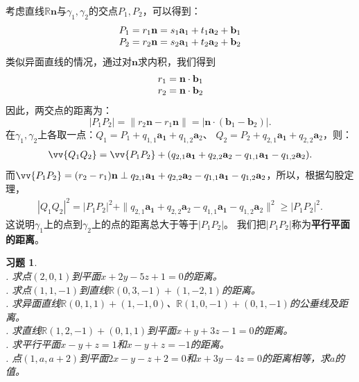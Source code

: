 \documentclass[12pt,UTF8]{ctexbook}
\newtheorem{xt}{习题}[section]
\begin{document}
考虑直线$\mathbb{R}\mathbf{n}$与$\gamma_1,\gamma_2$的交点$P_1,P_2$，可以得到：
$$
\begin{array}[]{c}
    P_1 = r_1\mathbf{n} = s_1\mathbf{a}_1 + t_1\mathbf{a}_2 + \mathbf{b}_1 \\
    P_2 = r_2\mathbf{n} = s_2\mathbf{a}_1 + t_2\mathbf{a}_2 + \mathbf{b}_2 
\end{array} 
$$
类似异面直线的情况，通过对$\mathbf{n}$求内积，我们得到
$$
\begin{array}[]{c}
    r_1 = \mathbf{n}\cdot\mathbf{b}_1 \\
    r_2 = \mathbf{n}\cdot\mathbf{b}_2 
\end{array}
$$
因此，两交点的距离为：
$$ |P_1P_2| = \| r_2\mathbf{n} - r_1\mathbf{n}\| = |\mathbf{n}\cdot(\mathbf{b}_1 - \mathbf{b}_2)|. $$
在$\gamma_1,\gamma_2$上各取一点：$Q_1 = P_1 + q_{1,1}\mathbf{a_1} + q_{1,2}\mathbf{a}_2$、
$Q_2 = P_2 + q_{2,1}\mathbf{a_1} + q_{2,2}\mathbf{a}_2$，则：
\begin{align*}
    \vv{Q_1Q_2} = \vv{P_1P_2}  + (q_{2,1}\mathbf{a_1} + q_{2,2}\mathbf{a}_2 - q_{1,1}\mathbf{a_1} - q_{1,2}\mathbf{a}_2).  
\end{align*}
而$\vv{P_1P_2} = (r_2 - r_1)\mathbf{n} \perp q_{2,1}\mathbf{a_1} + q_{2,2}\mathbf{a}_2 - q_{1,1}\mathbf{a_1} - q_{1,2}\mathbf{a}_2$，所以，根据勾股定理，
\begin{align*}
    |Q_1Q_2|^2 = |P_1P_2|^2 + \|q_{2,1}\mathbf{a_1} + q_{2,2}\mathbf{a}_2 - q_{1,1}\mathbf{a_1} - q_{1,2}\mathbf{a}_2\|^2 \geqslant |P_1P_2|^2.  
\end{align*}
这说明$\gamma_1$上的点到$\gamma_2$上的点的距离总大于等于$|P_1P_2|$。
我们把$|P_1P_2|$称为\textbf{平行平面的距离}。

\begin{xt}
    \mbox{} \\
    . 求点$(2,0,1)$到平面$x +2y - 5z + 1 = 0$的距离。\\
    . 求点$(1,1,-1)$到直线$\mathbb{R}(0,3,-1) + (1,-2,1)$的距离。\\
    . 求异面直线$\mathbb{R}(0,1,1)+(1,-1,0)$、$\mathbb{R}(1,0,-1)+(0,1,-1)$的公垂线及距离。\\
    . 求直线$\mathbb{R}(1,2,-1) + (0,1,1)$到平面$x + y + 3z - 1 = 0$的距离。\\
    . 求平行平面$x-y+z=1$和$x-y+z=-1$的距离。\\
    . 点$(1,a,a+2)$到平面$2x - y - z + 2 = 0$和$x + 3y - 4z = 0$的距离相等，求$a$的值。
\end{xt}
\end{document}
